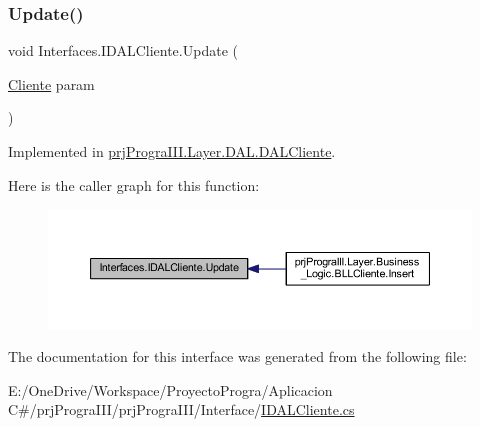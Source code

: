 \subsubsection{\texorpdfstring{Update()}{Update()}}
{\footnotesize\ttfamily void Interfaces.\+I\+D\+A\+L\+Cliente.\+Update (\begin{DoxyParamCaption}\item[{\hyperlink{classprj_progra_i_i_i_1_1_layer_1_1_entities_1_1_cliente}{Cliente}}]{param }\end{DoxyParamCaption})}



Implemented in \hyperlink{classprj_progra_i_i_i_1_1_layer_1_1_d_a_l_1_1_d_a_l_cliente_abced90e9e9a3314ee0af02dc6871f9ce}{prj\+Progra\+I\+I\+I.\+Layer.\+D\+A\+L.\+D\+A\+L\+Cliente}.

Here is the caller graph for this function\+:
\nopagebreak
\begin{figure}[H]
\begin{center}
\leavevmode
\includegraphics[width=350pt]{interface_interfaces_1_1_i_d_a_l_cliente_abe4143d07e9223b242e52e3b486f2c33_icgraph}
\end{center}
\end{figure}


The documentation for this interface was generated from the following file\+:\begin{DoxyCompactItemize}
\item 
E\+:/\+One\+Drive/\+Workspace/\+Proyecto\+Progra/\+Aplicacion C\#/prj\+Progra\+I\+I\+I/prj\+Progra\+I\+I\+I/\+Interface/\hyperlink{_i_d_a_l_cliente_8cs}{I\+D\+A\+L\+Cliente.\+cs}\end{DoxyCompactItemize}
